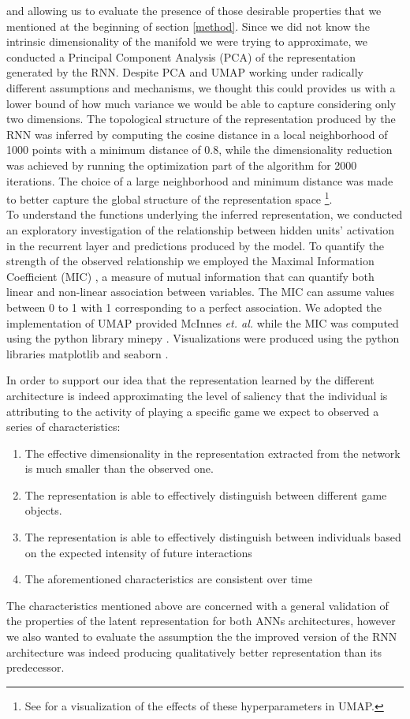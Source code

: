 and allowing us to evaluate the presence of those desirable properties that we mentioned at the beginning of section \ref{method}. Since we did not know the intrinsic dimensionality of the manifold we were trying to approximate, we conducted a Principal Component Analysis (PCA) of the representation generated by the RNN. Despite PCA and UMAP working under radically different assumptions and mechanisms, we thought this could provides us with a lower bound of how much variance we would be able to capture considering only two dimensions. The topological structure of the representation produced by the RNN was inferred by computing the cosine distance in a local neighborhood of 1000 points with a minimum distance of 0.8, while the dimensionality reduction was achieved by running the optimization part of the algorithm for 2000 iterations. The choice of a large neighborhood and minimum distance was made to better capture the global structure of the representation space \footnote{See \cite{umapwebs} for a visualization of the effects of these hyperparameters in UMAP.}.\\
To understand the functions underlying the inferred representation, we conducted an exploratory investigation of the relationship between hidden units' activation in the recurrent layer and predictions produced by the model. To quantify the strength of the observed relationship we employed the Maximal Information Coefficient (MIC) \cite{reshef2011detecting}, a measure of mutual information that can quantify both linear and non-linear association between variables. The MIC can assume values between 0 to 1 with 1 corresponding to a perfect association. We adopted the implementation of UMAP provided McInnes \textit{et. al.} \cite{mcinnes2018umap-software} while the MIC was computed using the python library minepy \cite{albanese2013minerva}. Visualizations were produced using the python libraries matplotlib \cite{hunter2007matplotlib} and seaborn \cite{waskom2021seaborn}.

In order to support our idea that the representation learned by the different architecture is indeed approximating the level of saliency that the individual is attributing to the activity of playing a specific game we expect to observed a series of characteristics:
\begin{enumerate}
    \item The effective dimensionality in the representation extracted from the network is much smaller than the observed one.
    \item The representation is able to effectively distinguish between different game objects.
    \item The representation is able to effectively distinguish between individuals based on the expected intensity of future interactions
    \item The aforementioned characteristics are consistent over time
\end{enumerate}
The characteristics mentioned above are concerned with a general validation of the properties of the latent representation for both ANNs architectures, however we also wanted to evaluate the assumption the the improved version of the RNN architecture was indeed producing qualitatively better representation than its predecessor.

